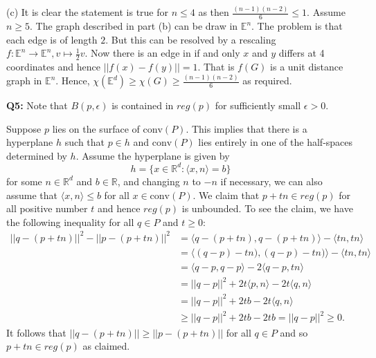 \documentclass[12pt,reqno]{amsart}
\theoremstyle{definition}
\newcommand{\RR}{\mathbb{R}}
\newcommand{\EE}{\mathbb{E}}
\newcommand{\conv}[1]{\mathrm{conv}(#1)}
\newcommand{\inner}[1]{\langle #1 \rangle}
\begin{document}
(c) It is clear the statement is true for $n\leq 4$ as then  $\frac{(n-1)(n-2)}{6}\leq 1$. Assume $n\geq 5$. The graph described in part (b) can be draw in $\EE^n$. The problem is that each edge is of length $2$. But this can be resolved by a rescaling $f:\EE^n \to \EE^n,  v\mapsto \frac{1}{2}v$. Now there is an edge in if and only $x$ and $y$ differs at 4 coordinates and hence  $||f(x)-f(y)||=1$. That is $f(G)$ is a unit distance graph in $\EE^n$. Hence, $\chi(\EE^d) \geq \chi(G) \geq   \frac{(n-1)(n-2)}{6}$ as required.

\newpage
\noindent \textbf{Q5:}  Note that $B(p,\epsilon)$ is contained in $reg(p)$ for sufficiently small $\epsilon >0$.


Suppose $p$ lies on the surface of $\conv{P}$. This implies that there is a hyperplane $h$ such that $p\in h$  and $\conv{P}$ lies entirely in one of the half-spaces determined by $h$. Assume the hyperplane is given by $$h=\{x\in \RR^d: \inner{x, n} = b \}$$ for some $n\in \RR^d$ and $b\in \RR$, and changing $n$ to $-n$ if necessary, we can also assume that $ \inner{x, n} \leq b$ for all $x\in \conv{P}$. We claim that $p+tn \in reg(p)$ for all positive number $t$ and hence $reg(p)$ is unbounded. To see the claim, we have the following inequality for all $q\in P$ and $t\geq 0$:
\begin{align*}
  ||q - (p+tn)||^2 - || p-(p+tn) ||^2 & = \inner{q - (p+tn),q - (p+tn)} - \inner{tn,tn}     \\
                                      & = \inner{(q - p) - tn),(q - p)-tn)} - \inner{tn,tn} \\
                                      & =\inner{ q - p,q - p} -2\inner{q - p,tn}            \\
                                      & = ||q-p||^2 +2t\inner{p,n} - 2t\inner{q,n}          \\
                                      & = ||q-p||^2 + 2tb - 2t\inner{q,n}                   \\
                                      & \geq  ||q-p||^2 + 2tb -2tb =||q-p||^2 \geq 0.
\end{align*}
It follows that $||q - (p+tn)|| \geq || p-(p+tn) ||$ for all $q\in P$ and so $p+tn \in reg(p)$ as claimed.\\
\end{document}
